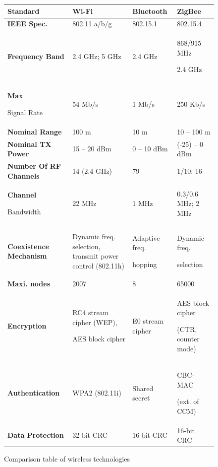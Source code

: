 \begin{figure}
	\begin{center}
		\label{fig:WirelessComparison}
\begin{tabularx}{1\textwidth}{>{\bfseries}p{}||p{}|p{}|p{}}
\hline Standard 			& Wi-Fi & Bluetooth & ZigBee \\ \hline
\hline IEEE Spec. 			& 802.11 a/b/g & 802.15.1  & 802.15.4 \\ 
\hline Frequency Band 		& 2.4 GHz; 5 GHz & 2.4 GHz & 868/915 MHz\par2.4 GHz \\ 
\hline Max \par Signal Rate 		& 54 Mb/s & 1 Mb/s & 250 Kb/s \\ 
\hline Nominal Range 		& 100 m & 10 m & 10 – 100 m  \\ 
\hline Nominal TX Power 	& 15 – 20 dBm & 0 – 10 dBm & (-25) – 0 dBm \\ 
\hline Number Of RF Channels & 14 (2.4 GHz) & 79  &  1/10; 16\\ 
\hline Channel \par Bandwidth 	& 22 MHz & 1 MHz  & 0.3/0.6 MHz; 2 MHz \\ 
\hline Coexistence Mechanism& Dynamic freq. selection, transmit power control (802.11h) & Adaptive freq.\par hopping & Dynamic freq. \par selection \\ 
\hline Maxi. nodes & 2007 & 8 & 65000 \\ 
\hline Encryption 			& RC4 stream cipher (WEP),\par AES block cipher & E0 stream cipher & AES block cipher \par(CTR, counter mode) \\ 
\hline Authentication 		& WPA2 (802.11i) & Shared secret & CBC-MAC \par(ext. of CCM) \\ 
\hline Data Protection 		& 32-bit CRC & 16-bit CRC &  16-bit CRC\\ 
\hline 
\end{tabularx} 
		\caption{Comparison table of wireless technologies}
	\end{center}
\end{figure}


